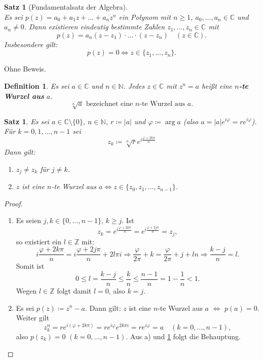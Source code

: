 \documentclass[12pt]{extreport} %
\newcommand{\C}{\mathbb{C}}
\newcommand{\N}{\mathbb{N}}
\newcommand{\Z}{\mathbb{Z}}
\theoremstyle{named}
\theoremstyle{itshape}
\newtheorem{satz}[unnamedtheorem]{Satz}
\newtheorem*{definition}{Definition}
\theoremstyle{normal}
\begin{document}
{	


\begin{satz}[Fundamentalsatz der Algebra] \label{12.3:prop-FundamentalsatzDerAlgebra} ~\\
	Es sei $p(z) = a_{0} + a_{1} z + \dotsc + a_{n} z^{n}$ ein Polynom mit $n \geq 1$, $a_{0}, \dotsc, a_{n} \in \C$ und $a_{n} \neq 0$. 
	Dann existieren eindeutig bestimmte Zahlen $z_{1}, \dotsc, z_{n} \in \C$ mit 
	$$p(z) = a_{n} (z - z_{1}) \cdot \dotsc \cdot (z - z_{n}) \quad (z \in \C).$$
	Insbesondere gilt: 
	$$ p(z)=0 \iff z \in \{z_{1}, \dotsc, z_{n}\}.$$
\end{satz}

Ohne Beweis.

\begin{definition}
	Es sei $a \in \C$ und $n \in \N$. Jedes $z \in \C$ mit $z^{n} = a$ hei{\ss}t eine \textbf{$n$-te Wurzel aus} $a$.
	$$ \sqrt[n]{a} \text{  bezeichnet eine $n$-te Wurzel aus } a.$$
\end{definition}


\begin{satz} \label{12.4:satz}
	Es sei $a \in \C \setminus \{ 0 \}$, $n \in \N$, $r \coloneqq |a|$ und $\varphi \coloneqq \arg a$ (also $a = |a| e^{i \varphi} = r e^{i \varphi}$). 
	Für $k = 0, 1, \dotsc, n - 1$ sei
		$$ z_{k} \coloneqq \sqrt[n]{r} e^{i \frac{\varphi + 2 k \pi}{n}} $$
	Dann gilt:
	\begin{enumerate}
		\item $z_{j} \neq z_{k}$ für $j \neq k$.
		\item $z$ ist eine $n$-te Wurzel aus $a \iff z \in \{ z_{0}, z_{1}, \dotsc, z_{n-1} \}$.
	\end{enumerate}
\end{satz}

\begin{proof} ~\
	\begin{enumerate}
		\item Es seien $j, k \in \{0, \dotsc, n - 1 \}$, $k \geq j$. Ist 
		        $$z_k=e^{i \frac{\varphi + 2k \pi}{n}} = e^{i \frac{\varphi + 2 j \pi}{n}}=z_j, $$ so existiert ein $l \in \Z$ mit:
			$$ 
			i \frac{\varphi + 2k \pi}{n} = i \frac{\varphi + 2 j \pi}{n} + 2 l \pi i \Rightarrow \frac{\varphi}{2 \pi} + k = \frac{\varphi}{2 \pi} + j + l n 
			\Rightarrow \frac{k - j}{n} = l.
			$$
			Somit ist
			$$ 0 \le  l= \frac{k - j}{n}  \leq \frac{k}{n} \leq \frac{n - 1}{n} = 1 - \frac{1}{n} < 1. $$
			Wegen $l \in \Z$ folgt damit $l = 0$, also $k = j$.
		\item   Es sei $p(z) \coloneqq z^{n} - a$. Dann gilt: $z$ ist eine $n$-te Wurzel aus $a$ $\iff$ $p(a) = 0$. Weiter gilt
			$$ z_{k}^{n} = r e^{i(\varphi +2 k \pi)} = r e^{i \varphi} e^{2 k \pi i} = r e^{i \varphi} = a \quad (k = 0, \dotsc, n - 1), $$
			also $p(z_{k}) = 0$ $(k = 0, \dotsc, n - 1)$. Aus a) und \ref{12.3:prop-FundamentalsatzDerAlgebra} folgt die Behauptung.
	\end{enumerate}
\end{proof}

}
\end{document}
